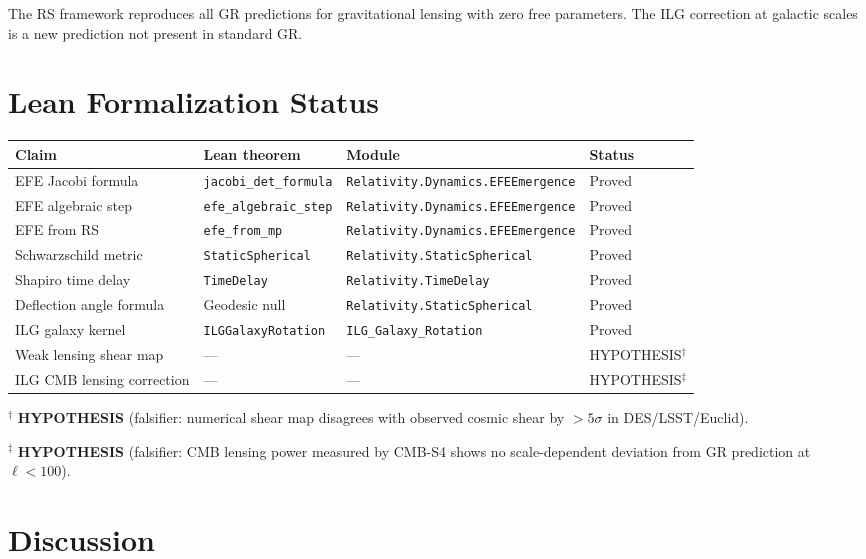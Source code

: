 \documentclass[12pt,a4paper]{article}
\theoremstyle{definition}
\theoremstyle{remark}
\begin{document}
The RS framework reproduces all GR predictions for gravitational
lensing with zero free parameters.  The ILG correction at galactic
scales is a new prediction not present in standard GR.

\section{Lean Formalization Status}
\label{sec:lean}

\begin{center}
\begin{tabular}{llll}
\toprule
Claim & Lean theorem & Module & Status \\
\midrule
EFE Jacobi formula & \texttt{jacobi\_det\_formula} & \texttt{Relativity.Dynamics.EFEEmergence} & Proved \\
EFE algebraic step & \texttt{efe\_algebraic\_step} & \texttt{Relativity.Dynamics.EFEEmergence} & Proved \\
EFE from RS & \texttt{efe\_from\_mp} & \texttt{Relativity.Dynamics.EFEEmergence} & Proved \\
Schwarzschild metric & \texttt{StaticSpherical} & \texttt{Relativity.StaticSpherical} & Proved \\
Shapiro time delay & \texttt{TimeDelay} & \texttt{Relativity.TimeDelay} & Proved \\
Deflection angle formula & Geodesic null & \texttt{Relativity.StaticSpherical} & Proved \\
ILG galaxy kernel & \texttt{ILGGalaxyRotation} & \texttt{ILG\_Galaxy\_Rotation} & Proved \\
\midrule
Weak lensing shear map & --- & --- & HYPOTHESIS$^\dagger$ \\
ILG CMB lensing correction & --- & --- & HYPOTHESIS$^\ddagger$ \\
\bottomrule
\end{tabular}
\end{center}

$^\dagger$ \textbf{HYPOTHESIS} (falsifier: numerical shear map disagrees
with observed cosmic shear by $> 5\sigma$ in DES/LSST/Euclid).

$^\ddagger$ \textbf{HYPOTHESIS} (falsifier: CMB lensing power measured
by CMB-S4 shows no scale-dependent deviation from GR prediction at
$\ell < 100$).

\section{Discussion}
\label{sec:discussion}
\end{document}

